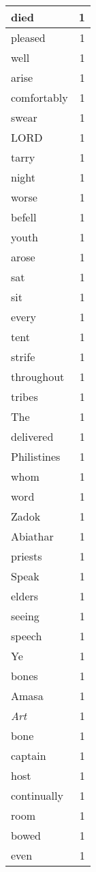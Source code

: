 \begin{center}
\begin{longtable}{l|r}
died & 1 \\ \hline
pleased & 1 \\ \hline
well & 1 \\ \hline
arise & 1 \\ \hline
comfortably & 1 \\ \hline
swear & 1 \\ \hline
LORD & 1 \\ \hline
tarry & 1 \\ \hline
night & 1 \\ \hline
worse & 1 \\ \hline
befell & 1 \\ \hline
youth & 1 \\ \hline
arose & 1 \\ \hline
sat & 1 \\ \hline
sit & 1 \\ \hline
every & 1 \\ \hline
tent & 1 \\ \hline
strife & 1 \\ \hline
throughout & 1 \\ \hline
tribes & 1 \\ \hline
The & 1 \\ \hline
delivered & 1 \\ \hline
Philistines & 1 \\ \hline
whom & 1 \\ \hline
word & 1 \\ \hline
Zadok & 1 \\ \hline
Abiathar & 1 \\ \hline
priests & 1 \\ \hline
Speak & 1 \\ \hline
elders & 1 \\ \hline
seeing & 1 \\ \hline
speech & 1 \\ \hline
Ye & 1 \\ \hline
bones & 1 \\ \hline
Amasa & 1 \\ \hline
\emph{Art} & 1 \\ \hline
bone & 1 \\ \hline
captain & 1 \\ \hline
host & 1 \\ \hline
continually & 1 \\ \hline
room & 1 \\ \hline
bowed & 1 \\ \hline
even & 1 \\ \hline

\end{longtable}
\end{center}
